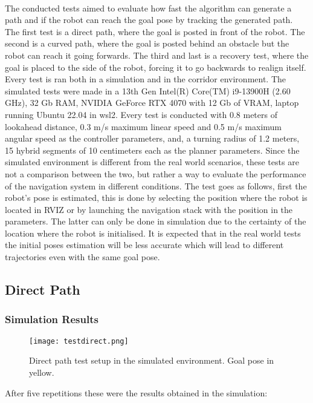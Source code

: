 \paragraph{}The conducted tests aimed to evaluate 
 how fast the algorithm can generate a path and if the robot can reach the goal 
pose by tracking the generated path. The first test is a direct path, where the goal is 
posted in front of the robot. The second is a curved path, where the goal is posted 
behind an obstacle but the robot can reach it going forwards. The third and last 
is a recovery test, where the goal is placed to the side of the robot, forcing 
it to go backwards to realign itself. Every test is ran both in a simulation and 
in the corridor environment.
The simulated tests were made in a 13th Gen Intel(R) Core(TM) i9-13900H (2.60 GHz), 32 Gb RAM, 
NVIDIA GeForce RTX 4070 with 12 Gb of VRAM, laptop running Ubuntu 22.04 in wsl2.
Every test is conducted with 0.8 meters of lookahead distance, 0.3 m/s maximum linear 
speed and 0.5 m/s maximum angular speed as the controller parameters, and, 
a turning radius of 1.2 meters, 15 hybrid segments of 10 centimeters each as the 
planner parameters.
Since the simulated environment is different from the real world scenarios, 
these tests are not a comparison between the two, but rather a way to evaluate 
the performance of the navigation system in different conditions.
The test goes as follows, first the robot's pose is estimated, this is done by selecting 
the position where the robot is located in RVIZ or by launching the 
navigation stack with the position in the parameters. The latter can only be done 
in simulation due to the certainty of the location where the robot is initialised. It is 
expected that in the real world tests the initial poses estimation will be less 
accurate which will lead to different trajectories even with the same goal pose.

\subsection{Direct Path}
\label{subsec:direct_path}
\subsubsection{Simulation Results}

\begin{figure}[h]
    \centering
    \texttt{[image: testdirect.png]}
    \caption{Direct path test setup in the simulated environment. Goal pose in yellow.}
    \label{fig:direct_path}
\end{figure}
After five repetitions these were the results obtained in the simulation:

